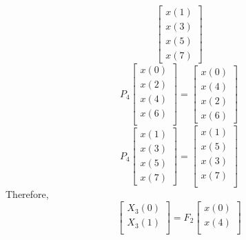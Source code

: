 \documentclass[journal,12pt,twocolumn]{IEEEtran}
\renewcommand\thesection{\arabic{section}}
\begin{document}
\begin{enumerate}[label=\thesection.\arabic*]
\begin{enumerate}[label=\arabic*.,ref=\thesection.\theenumi]
\begin{equation}
\begin{bmatrix}
         x(1) \\ 
         x(3) \\ 
         x(5) \\
         x(7)
       \end{bmatrix}
     \end{equation}
     \begin{equation}
       P_{4}
       \begin{bmatrix}
         x(0) \\ 
         x(2) \\ 
         x(4) \\ 
         x(6) \\
       \end{bmatrix}
       = 
       \begin{bmatrix}
         x(0) \\ 
         x(4) \\ 
         x(2) \\
         x(6)
       \end{bmatrix}
     \end{equation}
     \begin{equation}
       P_{4}
       \begin{bmatrix}
         x(1) \\ 
         x(3) \\ 
         x(5) \\
         x(7)
       \end{bmatrix}
       = 
       \begin{bmatrix}
         x(1) \\ 
         x(5) \\ 
         x(3) \\ 
         x(7) \\
       \end{bmatrix}
     \end{equation}
     Therefore,
     \begin{equation}
       \begin{bmatrix}
         X_{3}(0) \\ 
         X_{3}(1)\\ 
       \end{bmatrix}
       = F_{2}
       \begin{bmatrix}
         x(0) \\ 
         x(4) \\ 
       \end{bmatrix}
     \end{equation}
     \begin{equation}

\end{equation}
\end{enumerate}
\end{enumerate}
\end{document}
